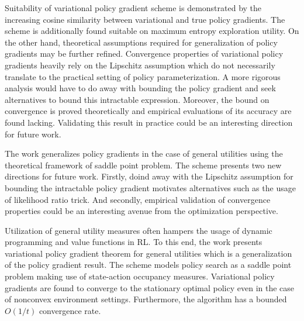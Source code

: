 \documentclass[11pt,letterpaper]{article}
\begin{document}
Suitability of variational policy gradient scheme is demonstrated by the increasing cosine similarity between variational and true policy gradients. The scheme is additionally found suitable on maximum entropy exploration utility. On the other hand, theoretical assumptions required for generalization of policy gradients may be further refined. Convergence properties of variational policy gradients heavily rely on the Lipschitz assumption which do not necessarily translate to the practical setting of policy parameterization. A more rigorous analysis would have to do away with bounding the policy gradient and seek alternatives to bound this intractable expression. Moreover, the bound on convergence is proved theoretically and empirical evaluations of its accuracy are found lacking. Validating this result in practice could be an interesting direction for future work. 

The work generalizes policy gradients in the case of general utilities using the theoretical framework of saddle point problem. The scheme presents two new directions for future work. Firstly, doind away with the Lipschitz assumption for bounding the intractable policy gradient motivates alternatives such as the usage of likelihood ratio trick. And secondly, empirical validation of convergence properties could be an interesting avenue from the optimization perspective. 

Utilization of general utility measures often hampers the usage of dynamic programming and value functions in RL. To this end, the work presents variational policy gradient theorem for general utilities which is a generalization of the policy gradient result. The scheme models policy search as a saddle point problem making use of state-action occupancy measures. Variational policy gradients are found to converge to the stationary optimal policy even in the case of nonconvex environment settings. Furthermore, the algorithm has a bounded $O(1/t)$ convergence rate. 
\end{document}
